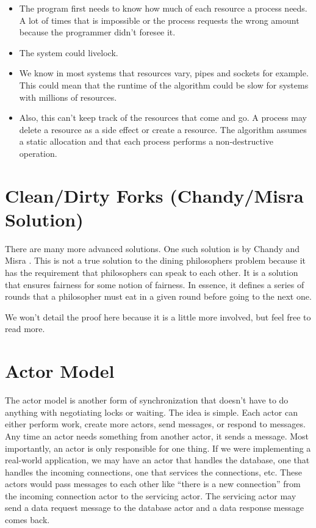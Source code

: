 \begin{itemize}
  \item The program first needs to know how much of each resource a process needs. A lot of times that is impossible or the process requests the wrong amount because the programmer didn't foresee it.
  \item The system could livelock.
  \item We know in most systems that resources vary, pipes and sockets for example. This could mean that the runtime of the algorithm could be slow for systems with millions of resources.
  \item Also, this can't keep track of the resources that come and go. A process may delete a resource as a side effect or create a resource. The algorithm assumes a static allocation and that each process performs a non-destructive operation.
\end{itemize}


\section{Clean/Dirty Forks (Chandy/Misra Solution)}

There are many more advanced solutions.
One such solution is by Chandy and Misra \cite{Chandy:1984:DPP:1780.1804}.
This is not a true solution to the dining philosophers problem because it has the requirement that philosophers can speak to each other.
It is a solution that ensures fairness for some notion of fairness.
In essence, it defines a series of rounds that a philosopher must eat in a given round before going to the next one.

We won't detail the proof here because it is a little more involved, but feel free to read more.

\section{Actor Model}

The actor model is another form of synchronization that doesn't have to do anything with negotiating locks or waiting.
The idea is simple.
Each actor can either perform work, create more actors, send messages, or respond to messages.
Any time an actor needs something from another actor, it sends a message.
Most importantly, an actor is only responsible for one thing.
If we were implementing a real-world application, we may have an actor that handles the database, one that handles the incoming connections, one that services the connections, etc.
These actors would pass messages to each other like ``there is a new connection'' from the incoming connection actor to the servicing actor.
The servicing actor may send a data request message to the database actor and a data response message comes back.

